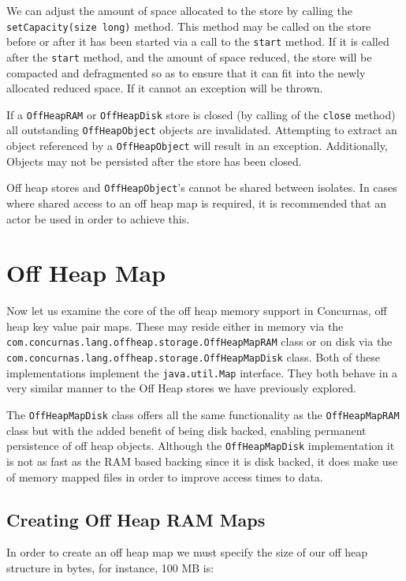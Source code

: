 \documentclass[conc-doc]{subfiles}
\begin{document}
We can adjust the amount of space allocated to the store by calling the \lstinline{setCapacity(size long)} method. This method may be called on the store before or after it has been started via a call to the \lstinline{start} method. If it is called after the \lstinline{start} method, and the amount of space reduced, the store will be compacted and defragmented so as to ensure that it can fit into the newly allocated reduced space. If it cannot an exception will be thrown.

If a \lstinline{OffHeapRAM} or \lstinline{OffHeapDisk} store is closed (by calling of the \lstinline{close} method) all outstanding \lstinline{OffHeapObject} objects are invalidated. Attempting to extract an object referenced by a \lstinline{OffHeapObject} will result in an exception. Additionally, Objects may not be persisted after the store has been closed.

Off heap stores and \lstinline{OffHeapObject}'s cannot be shared between isolates. In cases where shared access to an off heap map is required, it is recommended that an actor be used in order to achieve this. 


\section{Off Heap Map}
Now let us examine the core of the off heap memory support in Concurnas, off heap key value pair maps. These may reside either in memory via the \lstinline{com.concurnas.lang.offheap.storage.OffHeapMapRAM} class or on disk via the \lstinline{com.concurnas.lang.offheap.storage.OffHeapMapDisk} class. Both of these implementations implement the \lstinline{java.util.Map} interface. They both behave in a very similar manner to the Off Heap stores we have previously explored.

The \lstinline{OffHeapMapDisk} class offers all the same functionality as the \lstinline{OffHeapMapRAM} class but with the added benefit of being disk backed, enabling permanent persistence of off heap objects. Although the \lstinline{OffHeapMapDisk} implementation it is not as fast as the RAM based backing since it is disk backed, it does make use of memory mapped files in order to improve access times to data.

\subsection{Creating Off Heap RAM Maps}
In order to create an off heap map we must specify the size of our off heap structure in bytes, for instance, 100 MB is:
\end{document}
